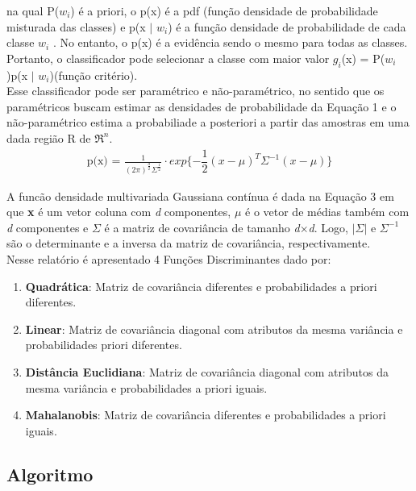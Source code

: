 \documentclass[a4paper]{article}
\begin{document}
na qual P($w_i$) é a priori, o p(x) é a pdf (função densidade de probabilidade misturada das classes) e p(x $\mid$ $w_i$) é a função densidade de probabilidade de cada classe $w_i$ . No entanto, o p(x) é a evidência sendo o mesmo para todas as classes. Portanto, o classificador pode selecionar a classe com maior valor $g_i$(x) = P($w_i$)p(x $\mid$ $w_i$)(função critério).\\

Esse classificador pode ser paramétrico e não-paramétrico, no sentido que os paramétricos buscam estimar as densidades de probabilidade da Equação 1 e o não-paramétrico estima a probabiliade a posteriori a partir das amostras em uma dada região R de $\Re^n$.\\

\begin{align}
\text {p(x) = $\frac{1}{(2\pi)^{\frac{d}{2}} \Sigma^{\frac{1}{2}}} \cdot exp\{-\dfrac{1}{2} (x - \mu)^T \Sigma^{-1} (x - \mu)\}$}
\end{align}

A funcão densidade multivariada Gaussiana contínua é dada na Equação 3 em que \textbf{x} é um vetor coluna com \textit{d} componentes, $\mu$ é o vetor de médias também com \textit{d} componentes e $\Sigma$ é a matriz de covariância de tamanho \textit{d}$\times$\textit{d}. Logo, $|\Sigma|$ e $\Sigma^{-1}$ são o determinante e a inversa da matriz de covariância, respectivamente.\\

Nesse relatório é apresentado 4 Funções Discriminantes dado por:

\begin{enumerate}
\item \textbf{Quadrática}: Matriz de covariância diferentes e probabilidades a priori diferentes.

\item \textbf{Linear}: Matriz de covariância diagonal com atributos da mesma variância e probabilidades priori diferentes.

\item \textbf{Distância Euclidiana}: Matriz de covariância diagonal com atributos da mesma variância e probabilidades a priori iguais.

\item \textbf{Mahalanobis}: Matriz de covariância diferentes e probabilidades a priori iguais.
\end{enumerate}


\subsection{Algoritmo}
\end{document}
